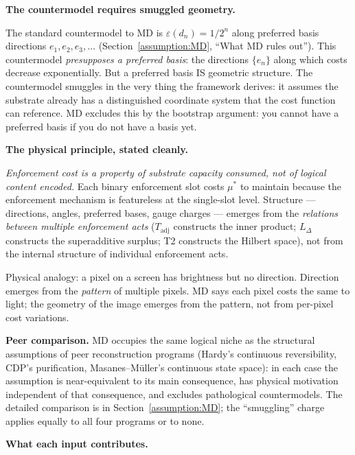 \documentclass[11pt]{article}
\theoremstyle{remark}
\begin{document}
\medskip\noindent\textbf{The countermodel requires smuggled geometry.}

The standard countermodel to MD is $\varepsilon(d_n) = 1/2^n$ along preferred basis directions $e_1, e_2, e_3, \ldots$ (Section~\ref{assumption:MD}, ``What MD rules out'').  This countermodel \emph{presupposes a preferred basis}: the directions $\{e_n\}$ along which costs decrease exponentially.  But a preferred basis IS geometric structure.  The countermodel smuggles in the very thing the framework derives: it assumes the substrate already has a distinguished coordinate system that the cost function can reference.  MD excludes this by the bootstrap argument: you cannot have a preferred basis if you do not have a basis yet.

\medskip\noindent\textbf{The physical principle, stated cleanly.}

\emph{Enforcement cost is a property of substrate capacity consumed, not of logical content encoded.}  Each binary enforcement slot costs $\mu^*$ to maintain because the enforcement mechanism is featureless at the single-slot level.  Structure --- directions, angles, preferred bases, gauge charges --- emerges from the \emph{relations between multiple enforcement acts} ($T_{\mathrm{adj}}$ constructs the inner product; $L_\Delta$ constructs the superadditive surplus; T2 constructs the Hilbert space), not from the internal structure of individual enforcement acts.

Physical analogy: a pixel on a screen has brightness but no direction.  Direction emerges from the \emph{pattern} of multiple pixels.  MD says each pixel costs the same to light; the geometry of the image emerges from the pattern, not from per-pixel cost variations.

\medskip\noindent\textbf{Peer comparison.}
MD occupies the same logical niche as the structural assumptions of peer reconstruction programs (Hardy's continuous reversibility, CDP's purification, Masanes--M\"uller's continuous state space): in each case the assumption is near-equivalent to its main consequence, has physical motivation independent of that consequence, and excludes pathological countermodels.  The detailed comparison is in Section~\ref{assumption:MD}; the ``smuggling'' charge applies equally to all four programs or to none.

\medskip\noindent\textbf{What each input contributes.}
\end{document}
